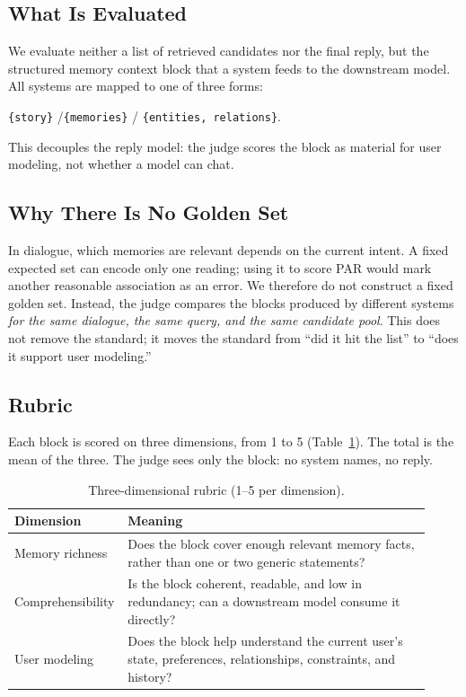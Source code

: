 \documentclass[11pt]{article}
\begin{document}
\subsection{What Is Evaluated}

We evaluate neither a list of retrieved candidates nor the final reply, but the structured
memory context block that a system feeds to the downstream model. All systems are mapped to one
of three forms:
\begin{center}
  \texttt{\{story\}} \quad/\quad \texttt{\{memories\}} \quad/\quad
  \texttt{\{entities, relations\}}.
\end{center}
This decouples the reply model: the judge scores the block as material for user modeling, not
whether a model can chat.

\subsection{Why There Is No Golden Set}

In dialogue, which memories are relevant depends on the current intent. A fixed expected set can
encode only one reading; using it to score PAR would mark another reasonable association as an
error. We therefore do not construct a fixed golden set. Instead, the judge compares the blocks
produced by different systems \emph{for the same dialogue, the same query, and the same candidate
pool}. This does not remove the standard; it moves the standard from ``did it hit the list'' to
``does it support user modeling.''

\subsection{Rubric}

Each block is scored on three dimensions, from 1 to 5 (Table~\ref{tab:rubric}). The total is the
mean of the three. The judge sees only the block: no system names, no reply.

\begin{table}[t]
  \centering
  \small
  \begin{tabular}{@{}p{0.2\linewidth}p{0.72\linewidth}@{}}
    \toprule
    Dimension & Meaning \\
    \midrule
    Memory richness & Does the block cover enough relevant memory facts, rather than one or two
                      generic statements? \\
    Comprehensibility & Is the block coherent, readable, and low in redundancy; can a downstream
                         model consume it directly? \\
    User modeling & Does the block help understand the current user's state, preferences,
                    relationships, constraints, and history? \\
    \bottomrule
  \end{tabular}
  \caption{Three-dimensional rubric (1--5 per dimension).}\label{tab:rubric}
\end{table}
\end{document}
